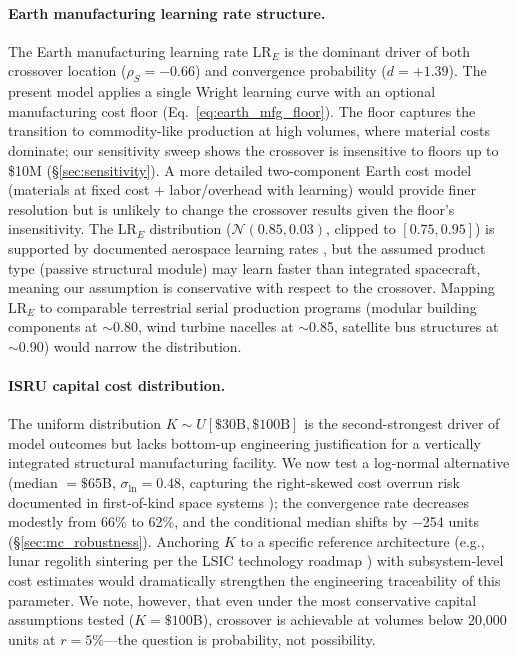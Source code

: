 \documentclass[preprint,12pt]{elsarticle}
\begin{document}
\paragraph{Earth manufacturing learning rate structure.} The Earth manufacturing learning rate LR$_E$ is the dominant driver of both crossover location ($\rho_S = -0.66$) and convergence probability ($d = +1.39$). The present model applies a single Wright learning curve with an optional manufacturing cost floor (Eq.~\ref{eq:earth_mfg_floor}). The floor captures the transition to commodity-like production at high volumes, where material costs dominate; our sensitivity sweep shows the crossover is insensitive to floors up to \$10M (\S\ref{sec:sensitivity}). A more detailed two-component Earth cost model (materials at fixed cost $+$ labor/overhead with learning) would provide finer resolution but is unlikely to change the crossover results given the floor's insensitivity. The LR$_E$ distribution ($\mathcal{N}(0.85, 0.03)$, clipped to $[0.75, 0.95]$) is supported by documented aerospace learning rates \cite{wertz2011}, but the assumed product type (passive structural module) may learn faster than integrated spacecraft, meaning our assumption is conservative with respect to the crossover. Mapping LR$_E$ to comparable terrestrial serial production programs (modular building components at $\sim$0.80, wind turbine nacelles at $\sim$0.85, satellite bus structures at $\sim$0.90) would narrow the distribution.

\paragraph{ISRU capital cost distribution.} The uniform distribution $K \sim U[\$30\text{B}, \$100\text{B}]$ is the second-strongest driver of model outcomes but lacks bottom-up engineering justification for a vertically integrated structural manufacturing facility. We now test a log-normal alternative (median $= \$65$B, $\sigma_{\ln} = 0.48$, capturing the right-skewed cost overrun risk documented in first-of-kind space systems \cite{wertz2011}); the convergence rate decreases modestly from 66\% to 62\%, and the conditional median shifts by $-$254 units (\S\ref{sec:mc_robustness}). Anchoring $K$ to a specific reference architecture (e.g., lunar regolith sintering per the LSIC technology roadmap \cite{lsic2021}) with subsystem-level cost estimates would dramatically strengthen the engineering traceability of this parameter. We note, however, that even under the most conservative capital assumptions tested ($K = \$100$B), crossover is achievable at volumes below 20{,}000 units at $r = 5\%$---the question is probability, not possibility.
\end{document}
